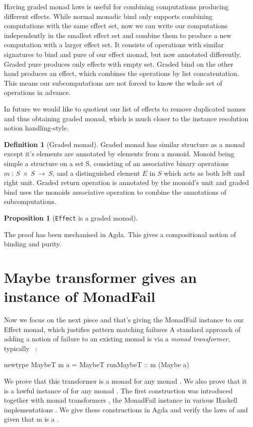 \documentclass[10pt]{article}
\newtheorem{proposition}{Proposition}[section]
\theoremstyle{definition}
\newtheorem{definition}{Definition}[section]
\theoremstyle{remark}
\begin{document}
Having graded monad laws is useful for combining computations producing different effects. While normal monadic bind only supports combining computations with the same effect set, now we can write our computations independently in the smallest effect set and combine them to produce a new computation with a larger effect set. It consists of operations with similar signatures to bind and pure of our effect monad, but now annotated differently. Graded pure produces only effects with empty set. Graded bind on the other hand produces an effect, which combines the operations by list concatentation. This means our subcomputations are not forced to know the whole set of operations in advance.

In future we would like to quotient our list of effects to remove duplicated names and thus obtaining graded monad, which is much closer to the instance resolution notion handling-style.


\begin{definition}[Graded monad]
	Graded monad has similar structure as a monad except it's elements are annotated by elements from a monoid. Monoid being simple a structure on a set S,
	consisting of an associative binary operations $m\: :\:S\:\times\:S\:\rightarrow\:S$, and a distinguished element $E$ in $S$ which acts as both left and right unit.
	Graded return operation is annotated by the monoid's unit and graded bind uses the monoids associative operation to combine the annotations of subcomputations.
\end{definition}

\begin{proposition}[\texttt{Effect} is a graded monad]
\end{proposition}

The proof has been mechanised in Agda.
This gives a compositional notion of binding and purity.

\section{Maybe transformer gives an instance of MonadFail}

Now we focus on the next piece and that's giving the MonadFail instance to our Effect monad,
which justifies pattern matching failures
A standard approach of adding a notion of failure to an existing
monad is via a \emph{monad transformer}, typically
~\cite{transformerpub}:
%
\begin{haskell}
newtype MaybeT m a = MaybeT { runMaybeT :: m (Maybe a) }
\end{haskell}
%
We prove that this transformer is a monad for any monad .
We also prove that it is a lawful instance of  for
any monad .
The first construction was introduced together with monad transformers
\cite{transformerpub}, the MonadFail instance in various Haskell
implementations \cite{mtl}. We give these constructions in Agda and
verify the laws of  and  given that m is a .
\end{document}
